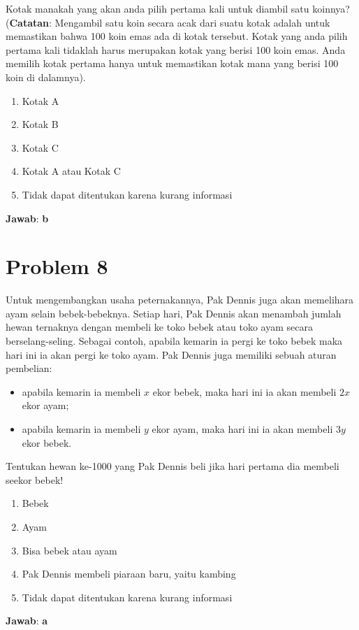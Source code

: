 \documentclass{article}
\theoremstyle{plain}
\begin{document}
\bigskip
\noindent Kotak manakah yang akan anda pilih pertama kali untuk diambil satu koinnya? \\ 
(\textbf{Catatan}: Mengambil satu koin secara acak dari suatu kotak adalah untuk memastikan bahwa 100 koin emas ada di kotak tersebut. Kotak yang anda pilih pertama kali tidaklah harus merupakan kotak yang berisi 100 koin emas. Anda memilih kotak pertama hanya untuk memastikan kotak mana yang berisi 100 koin di dalamnya).

	\begin{enumerate}[-,topsep=0pt, nosep,label=\alph*. ]
		\item Kotak A
		\item Kotak B
		\item Kotak C
		\item Kotak A atau Kotak C
		\item Tidak dapat ditentukan karena kurang informasi
	\end{enumerate}

\bigskip
\noindent \textbf{Jawab}: \textbf{b}


\newpage
\section*{Problem 8}
Untuk mengembangkan usaha peternakannya, Pak Dennis juga akan memelihara ayam selain bebek-bebeknya. Setiap hari, Pak Dennis akan menambah jumlah hewan ternaknya dengan membeli ke toko bebek atau toko ayam secara berselang-seling. Sebagai contoh, apabila kemarin ia pergi ke toko bebek maka hari ini ia akan pergi ke toko ayam. Pak Dennis juga memiliki sebuah aturan pembelian:
	\begin{itemize}[-,topsep=0pt, nosep]
		\item apabila kemarin ia membeli $x$ ekor bebek, maka hari ini ia akan membeli $2x$ ekor ayam;
		\item apabila kemarin ia membeli $y$ ekor ayam, maka hari ini ia akan membeli $3y$ ekor bebek.
	\end{itemize}

\bigskip
\noindent Tentukan hewan ke-1000 yang Pak Dennis beli jika hari pertama dia membeli seekor bebek!

	\begin{enumerate}[-,topsep=0pt, nosep,label=\alph*. ]
		\item Bebek
		\item Ayam
		\item Bisa bebek atau ayam
		\item Pak Dennis membeli piaraan baru, yaitu kambing
		\item Tidak dapat ditentukan karena kurang informasi
	\end{enumerate}

\bigskip
\noindent \textbf{Jawab}: \textbf{a}









%
%
\end{document}
